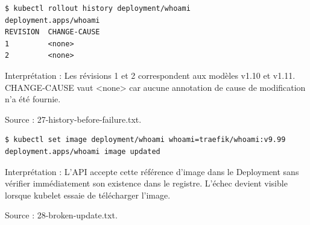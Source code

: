 \documentclass[11pt,a4paper]{article}
\begin{document}
\par\medskip\noindent\begin{minipage}{\linewidth}
\par\vspace{4pt}\noindent\begin{minipage}{\linewidth}
\begin{Verbatim}[breaklines=true,breakanywhere=true,fontsize=\footnotesize,frame=single,framesep=8pt,rulecolor=\color{teal}]
$ kubectl rollout history deployment/whoami
deployment.apps/whoami 
REVISION  CHANGE-CAUSE
1         <none>
2         <none>
\end{Verbatim}
\end{minipage}\par\vspace{6pt}

Interprétation : Les révisions 1 et 2 correspondent aux modèles v1.10 et v1.11. CHANGE-CAUSE vaut <none> car aucune annotation de cause de modification n'a été fournie.

{\footnotesize\color{teal} Source : 27-history-before-failure.txt.\par}
\end{minipage}\par\medskip

\par\medskip\noindent\begin{minipage}{\linewidth}
\par\vspace{4pt}\noindent\begin{minipage}{\linewidth}
\begin{Verbatim}[breaklines=true,breakanywhere=true,fontsize=\footnotesize,frame=single,framesep=8pt,rulecolor=\color{teal}]
$ kubectl set image deployment/whoami whoami=traefik/whoami:v9.99
deployment.apps/whoami image updated
\end{Verbatim}
\end{minipage}\par\vspace{6pt}

Interprétation : L'API accepte cette référence d'image dans le Deployment sans vérifier immédiatement son existence dans le registre. L'échec devient visible lorsque kubelet essaie de télécharger l'image.

{\footnotesize\color{teal} Source : 28-broken-update.txt.\par}
\end{minipage}\par\medskip
\end{document}

